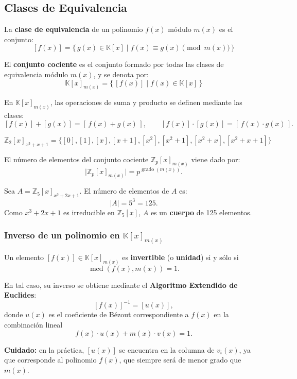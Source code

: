 \documentclass[a4paper,12pt]{article}
\begin{document}
\subsection{Clases de Equivalencia}

\begin{procedimiento}[title=Definición de clase de equivalencia módulo \(m(x)\)]
La \textbf{clase de equivalencia} de un polinomio \(f(x)\) módulo \(m(x)\) es el conjunto:
\[
[f(x)] = \{\, g(x) \in \mathbb{K}[x] \;|\; f(x) \equiv g(x) \pmod{m(x)} \,\}
\]
\end{procedimiento}

\begin{procedimiento}[title=Conjunto cociente ]
El \textbf{conjunto cociente} es el conjunto formado por todas las clases de equivalencia módulo \(m(x)\), y se denota por:
\[
\mathbb{K}[x]_{m(x)} = \{\, [f(x)] \;|\; f(x) \in \mathbb{K}[x] \,\}
\]

En \(\mathbb{K}[x]_{m(x)}\), las operaciones de suma y producto se definen mediante las clases:
\[
[f(x)] + [g(x)] = [\,f(x) + g(x)\,], \qquad [f(x)] \cdot [g(x)] = [\,f(x) \cdot g(x)\,].
\]
\end{procedimiento}


\begin{ejemplo}
\[
\mathbb{Z}_2[x]_{x^3+x+1} = \{[0],[1],[x],[x+1],[x^2],[x^2+1],[x^2+x],[x^2+x+1]\}
\]
\end{ejemplo}

\begin{procedimiento}[title=Cardinal del conjunto cociente]
El número de elementos del conjunto cociente \(\mathbb{Z}_p[x]_{m(x)}\) viene dado por:
\[
\bigl|\mathbb{Z}_p[x]_{m(x)}\bigr| = p^{\operatorname{grado}(m(x))}.
\]
\end{procedimiento}

\begin{ejemplo}
Sea \(A = \mathbb{Z}_5[x]_{x^3+2x+1}\).  
El número de elementos de \(A\) es:
\[
|A| = 5^3 = 125.
\]
Como \(x^3+2x+1\) es irreducible en \(\mathbb{Z}_5[x]\), \(A\) es un \textbf{cuerpo} de 125 elementos.
\end{ejemplo}

\subsubsection{Inverso de un polinomio en \(\mathbb{K}[x]_{m(x)}\)}

\begin{procedimiento}[title=Inverso en \(\mathbb{K}\)]
Un elemento \([f(x)] \in \mathbb{K}[x]_{m(x)}\) es \textbf{invertible} (o \textbf{unidad}) si y sólo si
\[
\operatorname{mcd}(f(x), m(x)) = 1.
\]

En tal caso, su inverso se obtiene mediante el \textbf{Algoritmo Extendido de Euclides}:
\[
[f(x)]^{-1} = [u(x)],
\]
donde \(u(x)\) es el coeficiente de Bézout correspondiente a \(f(x)\) en la combinación lineal
\[
f(x)\cdot u(x) + m(x)\cdot v(x) = 1.
\]

\textbf{Cuidado:} en la práctica, \([u(x)]\) se encuentra en la columna de \(v_i(x)\), ya que corresponde al polinomio \(f(x)\), que siempre será de menor grado que \(m(x)\).
\end{procedimiento}
\end{document}
